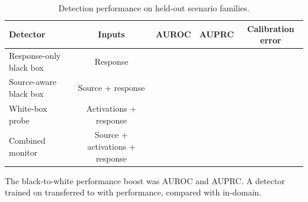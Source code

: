 \begin{table}[H]
\centering
\caption{Detection performance on held-out scenario families.}
\label{tab:detectors}
\small
\begin{tabularx}{\textwidth}{@{}Ycccc@{}}
\toprule
Detector & Inputs & AUROC & AUPRC & Calibration error \\
\midrule
Response-only black box & Response & \resultcell{} & \resultcell{} & \resultcell{} \\
Source-aware black box & Source + response & \resultcell{} & \resultcell{} & \resultcell{} \\
White-box probe & Activations + response & \resultcell{} & \resultcell{} & \resultcell{} \\
Combined monitor & Source + activations + response & \resultcell{} & \resultcell{} & \resultcell{} \\
\bottomrule
\end{tabularx}
\end{table}

The black-to-white performance boost was \resultcell{} AUROC and \resultcell{} AUPRC. A detector trained on  transferred to  with \resultcell{} performance, compared with \resultcell{} in-domain. 
